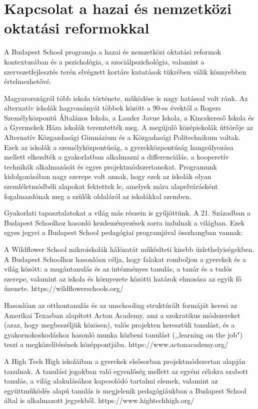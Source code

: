 \section{Kapcsolat a hazai és nemzetközi oktatási reformokkal}
\label{sec:kapcsolat_reformokkal}

A Budapest School programja a hazai és nemzetközi oktatási reformok
kontextusában és a pszichológia, a szociálpszichológia, valamint a
szervezetfejlesztés terén elvégzett kortárs kutatások tükrében válik
könnyebben értelmezhetővé.

Magyarországról több iskola története, működése is nagy hatással volt ránk. Az
alternatív iskolák hagyományát többek között a 90-es évektől a Rogers
Személyközpontú Általános Iskola, a Lauder Javne Iskola, a Kincskereső
Iskola és a Gyermekek Háza iskolák teremtették meg. A megújuló
középiskolák úttörője az Alternatív Közgazdasági Gimnázium és a
Közgadasági Politechnikum voltak. Ezek az iskolák a személyközpontúság,
a gyerekközpontúság hangsúlyozása mellett elkezdték a gyakorlatban
alkalmazni a differenciálás, a kooperetív technikák alkalmazását és
egyes projektmódszertanokat. Programunk kidolgozásában nagy szerepe volt
annak, hogy ezek az iskolák olyan szemléletmódbéli alapokat fektettek
le, amelyek mára alapelvárásként fogalmazdónak meg a szülők oldaláról az
iskolákkal szemben.

Gyakorlati tapasztalatokat a világ más részein is gyűjöttünk. A 21.
Században a Budapest Schoolhoz hasonló kezdeményezések sorra indulnak a
világban. Ezek egyes jegyei a Budapest School pedagógiai programjával
összhangban vannak:

A Wildflower School mikroiskolák hálózatát működteti kisebb
üzlethelyiségekben. A Budapest Schoolhoz hasonlóan célja, hogy falakat
romboljon a gyerekek és a világ között: a magántanulás és az intézményes
tanulás, a tanár és a tudós szerepe, valamint az iskola és környezete
közötti határok elmosása az egyik fő üzenete.
https://wildflowerschools.org/

Hasonlóan az otthontanulás és az  unschooling struktúrált formáját keresi az
Amerikai Texasban alapított Acton Academy, ami a szokratikus módszereket (azaz,
hogy megbeszéljük közösen), valós projekten keresztüli tanulást, és a
gyakornokoskodáshoz hasonló munka közbeni tanulást (,,learning on the job")
teszi a megközelítésének középpontjába.
https://www.actonacademy.org/

A High Tech High iskoláiban a gyerekek elsősorban projektmódszertan
alapján tanulnak. A tanulási jogokban való egyenlőség mellett az egyéni
célokra szabott tanulás, a világ alakulásához kapcsolódó tartalmi
elemek, valamint az együttműködés alapú tanulás is megjelenik
pedagógiáukban a Budapest School által is alkalmazott jegyekből.
https://www.hightechhigh.org/


